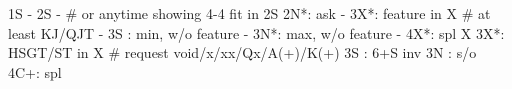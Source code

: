 1S - 2S -  # or anytime showing 4-4 fit in 2S
2N*: ask
   - 3X*: feature in X  # at least KJ/QJT
   - 3S : min, w/o feature
   - 3N*: max, w/o feature
   - 4X*: spl X
3X*: HSGT/ST in X  # request void/x/xx/Qx/A(+)/K(+)
3S : 6+S inv
3N : s/o
4C+: spl
